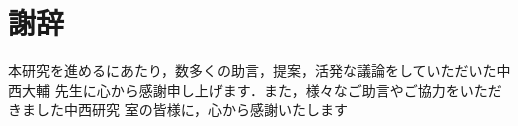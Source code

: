\newpage
\section*{謝辞}
本研究を進めるにあたり，数多くの助言，提案，活発な議論をしていただいた中西大輔
先生に心から感謝申し上げます．また，様々なご助言やご協力をいただきました中西研究
室の皆様に，心から感謝いたします